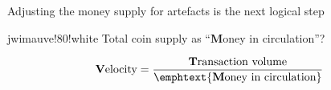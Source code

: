 
\begin{frame}{Adjusting the money supply for artefacts is the next logical step}
	\vspace{1ex}
	\begin{alertblockc}[]{}{jwimauve!80!white}		
		Total coin supply as ``\textbf{M}oney in circulation''? 
	\end{alertblockc}
	\begin{align*}
	  \text{\textbf{V}elocity} = \frac{\text{\textbf{T}ransaction volume}}{\text{\emphtext{\textbf{M}oney in circulation}}}
	\end{align*}
	\vspace{3em}
\end{frame}
